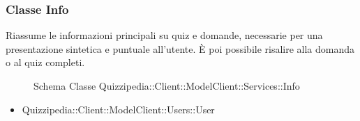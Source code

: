 \subsubsection{Classe Info}
Riassume le informazioni principali su quiz e domande, necessarie per una presentazione sintetica e puntuale all'utente. È poi possibile risalire alla domanda o al quiz completi.
\begin{figure}[H]
\centering
\noindent{}
\caption{Schema Classe Quizzipedia::Client::ModelClient::Services::Info}
\end{figure}
\begin{itemize}
\item Quizzipedia::Client::ModelClient::Users::User
\end{itemize}
